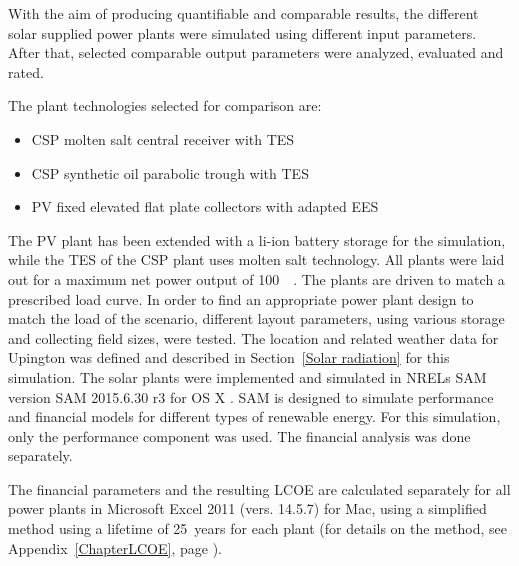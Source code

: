 With the aim of producing quantifiable and comparable results, the different solar supplied power plants were simulated using different input parameters. After that, selected comparable output parameters were analyzed, evaluated and rated.

The plant technologies selected for comparison are:
\begin{itemize}
\item \ac{CSP} molten salt central receiver with \acl{TES}
\item \ac{CSP} synthetic oil parabolic trough with \acl{TES}
\item \ac{PV} fixed elevated flat plate collectors with adapted \acl{EES}
\end{itemize}
The \ac{PV} plant has been extended with a \ac{li-ion} battery storage for the simulation, while the \ac{TES} of the \ac{CSP} plant uses molten salt technology. All plants were laid out for a maximum net power output of \SI{100}{\mega\wattel}. The plants are driven to match a prescribed load curve. In order to find an appropriate power plant design to match the load of the scenario, different layout parameters, using various storage and collecting field sizes, were tested. The location and related weather data for Upington was defined and described in Section~\ref{Solar radiation} for this simulation. The solar plants were implemented and simulated in \acp{NREL} \acf{SAM} version SAM 2015.6.30 r3 for OS X \cite{NREL2015}. \ac{SAM} is designed to simulate performance and financial models for different types of renewable energy. For this simulation, only the performance component was used. The financial analysis was done separately. 

The financial parameters and the resulting \ac{LCOE} are calculated separately for all power plants in Microsoft Excel 2011 (vers. 14.5.7) for Mac, using a simplified method using a lifetime of \SI{25}{years} for each plant (for details on the method, see Appendix~\ref{ChapterLCOE}, page \pageref{ChapterLCOE}).
